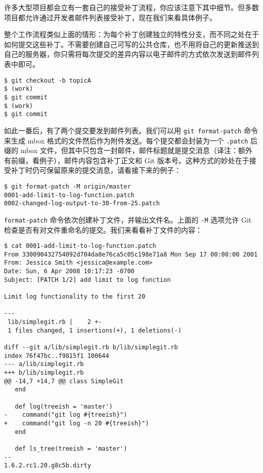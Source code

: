 \documentclass[a4paper]{book}
\begin{document}
许多大型项目都会立有一套自己的接受补丁流程，你应该注意下其中细节。但多数项目都允许通过开发者邮件列表接受补丁，现在我们来看具体例子。

整个工作流程类似上面的情形：为每个补丁创建独立的特性分支，而不同之处在于如何提交这些补丁。不需要创建自己可写的公共仓库，也不用将自己的更新推送到自己的服务器，你只需将每次提交的差异内容以电子邮件的方式依次发送到邮件列表中即可。

\begin{shaded}\begin{verbatim}
$ git checkout -b topicA
$ (work)
$ git commit
$ (work)
$ git commit
\end{verbatim}\end{shaded}

如此一番后，有了两个提交要发到邮件列表。我们可以用 \texttt{git format-patch} 命令来生成 mbox 格式的文件然后作为附件发送。每个提交都会封装为一个 \texttt{.patch} 后缀的 mbox 文件，但其中只包含一封邮件，邮件标题就是提交消息（译注：额外有前缀，看例子），邮件内容包含补丁正文和 Git 版本号。这种方式的妙处在于接受补丁时仍可保留原来的提交消息，请看接下来的例子：

\begin{shaded}\begin{verbatim}
$ git format-patch -M origin/master
0001-add-limit-to-log-function.patch
0002-changed-log-output-to-30-from-25.patch
\end{verbatim}\end{shaded}

\texttt{format-patch} 命令依次创建补丁文件，并输出文件名。上面的 \texttt{-M} 选项允许 Git 检查是否有对文件重命名的提交。我们来看看补丁文件的内容：

\begin{shaded}\begin{verbatim}
$ cat 0001-add-limit-to-log-function.patch 
From 330090432754092d704da8e76ca5c05c198e71a8 Mon Sep 17 00:00:00 2001
From: Jessica Smith <jessica@example.com>
Date: Sun, 6 Apr 2008 10:17:23 -0700
Subject: [PATCH 1/2] add limit to log function

Limit log functionality to the first 20

---
 lib/simplegit.rb |    2 +-
 1 files changed, 1 insertions(+), 1 deletions(-)

diff --git a/lib/simplegit.rb b/lib/simplegit.rb
index 76f47bc..f9815f1 100644
--- a/lib/simplegit.rb
+++ b/lib/simplegit.rb
@@ -14,7 +14,7 @@ class SimpleGit
   end

   def log(treeish = 'master')
-    command("git log #{treeish}")
+    command("git log -n 20 #{treeish}")
   end

   def ls_tree(treeish = 'master')
-- 
1.6.2.rc1.20.g8c5b.dirty
\end{verbatim}\end{shaded}
\end{document}
